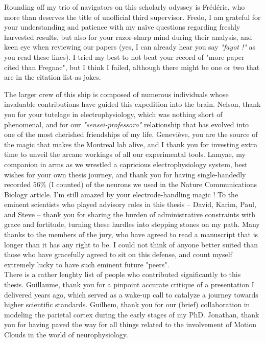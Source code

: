 Rounding off my trio of navigators on this scholarly odyssey is Frédéric, who more than deserves the title of unofficial third supervisor. Fredo, I am grateful for your understanding and patience with my naïve questions regarding freshly harvested results, but also for your razor-sharp mind during their analysis, and keen eye when reviewing our papers (yes, I can already hear you say \textit{"fayot !"} as you read these lines). I tried my best to not beat your record of "more paper cited than Fregnac", but I think I failed, although there might be one or two that are in the citation list as jokes.

The larger crew of this ship is composed of numerous individuals whose invaluable contributions have guided this expedition into the brain.
Nelson, thank you for your tutelage in electrophysiology, which was nothing short of phenomenal, and for our \textit{"sensei-professoro"} relationship that has evolved into one of the most cherished friendships of my life. 
Geneviève, you are the source of the magic that makes the Montreal lab alive, and I thank you for investing extra time to unveil the arcane workings of all our experimental tools. Lamyae, my companion in arms as we wrestled a capricious electrophysiology system, best wishes for your own thesis journey, and thank you for having single-handedly recorded $56\%$ (I counted) of the neurons we used in the Nature Communications Biology article. I'm still amazed by your electrode-handling magic ! 
To the eminent scientists who played advisory roles in this thesis – David, Karim, Paul, and Steve – thank you for sharing the burden of administrative constraints with grace and fortitude, turning these hurdles into stepping stones on my path. Many thanks to the members of the jury, who have agreed to read a manuscript that is longer than it has any right to be. I could not think of anyone better suited than those who have gracefully agreed to sit on this defense, and count myself extremely lucky to have such eminent future "peers". \\
There is a rather lenghty list of people who contributed significantly to this thesis. Guillaume, thank you for a pinpoint accurate critique of a presentation I delivered years ago, which served as a wake-up call to catalyze a journey towards higher scientific standards. 
Guilhem, thank you for our (brief) collaboration in modeling the parietal cortex during the early stages of my PhD.
Jonathan, thank you for having paved the way for all things related to the involvement of Motion Clouds in the world of neurophysiology.
